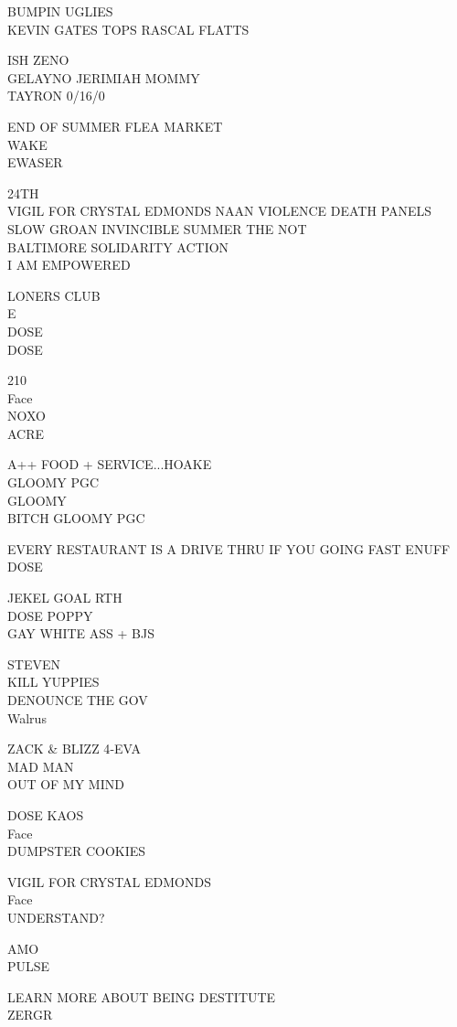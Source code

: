 \documentclass[10pt,letterpaper]{article}
\begin{document}
BUMPIN UGLIES\\
KEVIN GATES TOPS RASCAL FLATTS

ISH ZENO\\
GELAYNO JERIMIAH MOMMY\\
TAYRON 0/16/0

END OF SUMMER FLEA MARKET\\
WAKE\\
EWASER

24TH\\
VIGIL FOR CRYSTAL EDMONDS NAAN VIOLENCE DEATH PANELS SLOW GROAN INVINCIBLE SUMMER THE NOT\\
BALTIMORE SOLIDARITY ACTION\\
I AM EMPOWERED

LONERS CLUB\\
E\\
DOSE\\
DOSE

210\\
Face\\
NOXO\\
ACRE

A++ FOOD + SERVICE...HOAKE\\
GLOOMY PGC\\
GLOOMY\\
BITCH GLOOMY PGC

EVERY RESTAURANT IS A DRIVE THRU IF YOU GOING FAST ENUFF\\
DOSE

JEKEL GOAL RTH\\
DOSE POPPY\\
GAY WHITE ASS + BJS

STEVEN\\
KILL YUPPIES\\
DENOUNCE THE GOV\\
Walrus

ZACK \& BLIZZ 4{-}EVA\\
MAD MAN\\
OUT OF MY MIND

DOSE KAOS\\
Face\\
DUMPSTER COOKIES

VIGIL FOR CRYSTAL EDMONDS\\
Face\\
UNDERSTAND?

AMO\\
PULSE

LEARN MORE ABOUT BEING DESTITUTE\\
ZERGR
\end{document}
